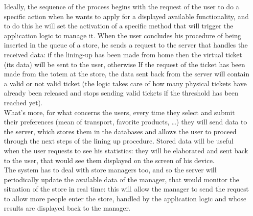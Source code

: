 \documentclass[]{article}
\begin{document}
					\noindent
					Ideally, the sequence of the process begins with the request of the user to do a specific action when he wants to apply for a displayed available functionality, and to do this he will set the activation of a specific method that will trigger the application logic to manage it.
When the user concludes his procedure of being inserted in the queue of a store, he sends a request to the server that handles the received data: if the lining-up has been made from home then the virtual ticket (its data) will be sent to the user, otherwise If the request of the ticket has been made from the totem at the store, the data sent back from the server will contain a valid or not valid ticket (the logic takes care of how many physical tickets have already been released and stops  sending valid tickets if the threshold has been reached yet).\\
					\newline
What’s more, for what concerns the users, every time they select and submit their preferences (mean of transport, favorite products, …) they will send data to the server, which stores them in the databases and allows the user to proceed through the next steps of the lining up procedure. Stored data will be useful when the user requests to see his statistics: they will be elaborated and sent back to the user, that would see them displayed on the screen of his device.\\
					\newline
The system has to deal with store managers too, and so the server will periodically update the available data of the manager, that would monitor the situation of the store in real time: this will allow the manager to send the request to allow more people enter the store, handled by the application logic and whose results are displayed back to the manager. \newline
\end{document}
